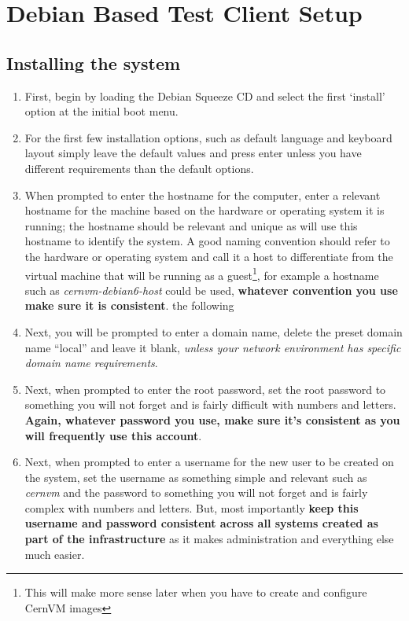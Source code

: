 \newpage
\section{Debian Based Test Client Setup}
\subsection{Installing the system}
\label{sec:debianinstall}
\flushleft
\begin{enumerate}
\item 	First, begin by loading the Debian Squeeze CD and select the first `install' option at the initial boot menu.

\item	For the first few installation options, such as default language and keyboard layout simply leave the default values
		and press enter unless you have different requirements than the default options.

\item	When prompted to enter the hostname for the computer, enter a relevant hostname for the machine based on the hardware or 
		operating system it is running; the hostname should be relevant and unique as \tapper will use this hostname to identify the 
		system. A good naming convention should refer to the hardware or operating system and call it a host to differentiate from the 
		virtual machine that will be running as a guest\footnote{This will make more sense later when you have to create and configure 
		CernVM images}, for example a hostname such as \emph{cernvm-debian6-host} could be used, {\bf whatever convention you use make 
		sure it is consistent}.
the following
\item	Next, you will be prompted to enter a domain name, delete the preset domain name ``local'' and leave it blank, \emph{unless
		your network environment has specific domain name requirements}.

\item	Next, when prompted to enter the root password, set the root password to something you will not forget and is
		fairly difficult with numbers and letters. {\bf Again, whatever password you use,  make sure it's consistent as you will 	
		frequently use this account}.

\item 	Next, when prompted to enter a username for the new user to be created on the system, set the username as something simple and 
		relevant such as \emph{cernvm} and the password to something you will not forget and is fairly complex with numbers and letters. 
		But, most importantly {\bf keep this username and password consistent across all systems created as part of the infrastructure} 
		as it makes administration and everything else much easier.


\end{enumerate}
